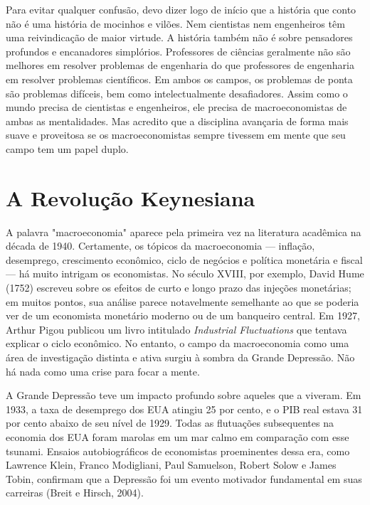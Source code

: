 \documentclass[12pt]{article}
\begin{document}
Para evitar qualquer confusão, devo dizer logo de início que a história que conto não é uma história de mocinhos e vilões. Nem cientistas nem engenheiros têm uma reivindicação de maior virtude. A história também não é sobre pensadores profundos e encanadores simplórios. Professores de ciências geralmente não são melhores em resolver problemas de engenharia do que professores de engenharia em resolver problemas científicos. Em ambos os campos, os problemas de ponta são problemas difíceis, bem como intelectualmente desafiadores. Assim como o mundo precisa de cientistas e engenheiros, ele precisa de macroeconomistas de ambas as mentalidades. Mas acredito que a disciplina avançaria de forma mais suave e proveitosa se os macroeconomistas sempre tivessem em mente que seu campo tem um papel duplo.

\section{A Revolução Keynesiana}

A palavra "macroeconomia" aparece pela primeira vez na literatura acadêmica na década de 1940. Certamente, os tópicos da macroeconomia — inflação, desemprego, crescimento econômico, ciclo de negócios e política monetária e fiscal — há muito intrigam os economistas. No século XVIII, por exemplo, David Hume (1752) escreveu sobre os efeitos de curto e longo prazo das injeções monetárias; em muitos pontos, sua análise parece notavelmente semelhante ao que se poderia ver de um economista monetário moderno ou de um banqueiro central. Em 1927, Arthur Pigou publicou um livro intitulado \textit{Industrial Fluctuations} que tentava explicar o ciclo econômico. No entanto, o campo da macroeconomia como uma área de investigação distinta e ativa surgiu à sombra da Grande Depressão. Não há nada como uma crise para focar a mente.

A Grande Depressão teve um impacto profundo sobre aqueles que a viveram. Em 1933, a taxa de desemprego dos EUA atingiu 25 por cento, e o PIB real estava 31 por cento abaixo de seu nível de 1929. Todas as flutuações subsequentes na economia dos EUA foram marolas em um mar calmo em comparação com esse tsunami. Ensaios autobiográficos de economistas proeminentes dessa era, como Lawrence Klein, Franco Modigliani, Paul Samuelson, Robert Solow e James Tobin, confirmam que a Depressão foi um evento motivador fundamental em suas carreiras (Breit e Hirsch, 2004).
\end{document}
